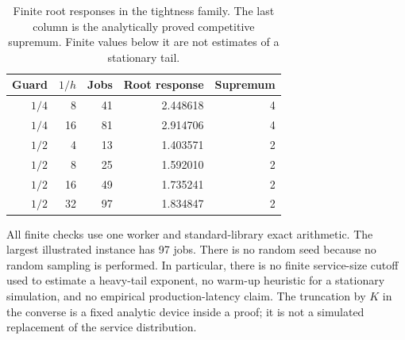 \begin{table}[t]
\centering
\caption{Finite root responses in the tightness family. The last column is the analytically proved competitive supremum. Finite values below it are not estimates of a stationary tail.}\label{tab:tightness}
\begin{tabular}{rrrrr}
\toprule
Guard & $1/h$ & Jobs & Root response & Supremum\\
\midrule
$1/4$ & 8 & 41 & 2.448618 & 4\\
$1/4$ & 16 & 81 & 2.914706 & 4\\
$1/2$ & 4 & 13 & 1.403571 & 2\\
$1/2$ & 8 & 25 & 1.592010 & 2\\
$1/2$ & 16 & 49 & 1.735241 & 2\\
$1/2$ & 32 & 97 & 1.834847 & 2\\
\bottomrule
\end{tabular}
\end{table}

All finite checks use one worker and standard-library exact arithmetic. The largest illustrated instance has 97 jobs. There is no random seed because no random sampling is performed. In particular, there is no finite service-size cutoff used to estimate a heavy-tail exponent, no warm-up heuristic for a stationary simulation, and no empirical production-latency claim. The truncation by $K$ in the converse is a fixed analytic device inside a proof; it is not a simulated replacement of the service distribution.
